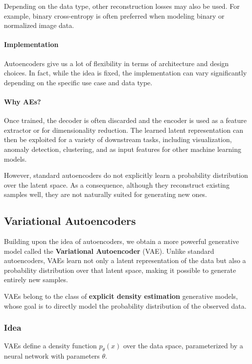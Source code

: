 Depending on the data type, other reconstruction losses may also be used. For example, binary cross-entropy is often preferred when modeling binary or normalized image data.

\paragraph{Implementation}
Autoencoders give us a lot of flexibility in terms of architecture and design choices. In fact, while the idea is fixed, 
the implementation can vary significantly depending on the specific use case and data type.


\paragraph{Why AEs?}
Once trained, the decoder is often discarded and the encoder is used as a feature extractor or for dimensionality reduction. The learned latent representation can then be exploited for a variety of downstream tasks, including visualization, anomaly detection, clustering, and as input features for other machine learning models.

However, standard autoencoders do not explicitly learn a probability distribution over the latent space. As a consequence, although they reconstruct existing samples well, they are not naturally suited for generating new ones.


\subsection{Variational Autoencoders}

Building upon the idea of autoencoders, we obtain a more powerful generative model called the \textbf{Variational Autoencoder} (VAE). Unlike standard autoencoders, VAEs learn not only a latent representation of the data but also a probability distribution over that latent space, making it possible to generate entirely new samples.

VAEs belong to the class of \textbf{explicit density estimation} generative models, whose goal is to directly model the probability distribution of the observed data.

\subsubsection{Idea}
VAEs define a density function $p_\theta(x)$ over the data space, parameterized by a neural network with parameters $\theta$. 

